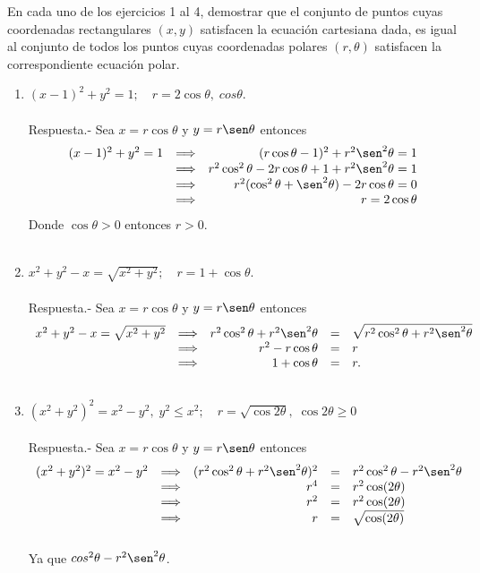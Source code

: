 En cada uno de los ejercicios 1 al 4, demostrar que el conjunto de puntos cuyas coordenadas rectangulares $(x,y)$ satisfacen la ecuación cartesiana dada, es igual al conjunto de todos los puntos cuyas coordenadas polares $(r,\theta)$ satisfacen la correspondiente ecuación polar.
\begin{enumerate}

    \item $(x-1)^2 + y^2 = 1;\quad r=2\cos \theta, \; cos \theta$.\\\\
	Respuesta.-\; Sea $x = r\cos \theta$ y $y=r\sen \theta$ entonces
	$$\begin{array}{rcr}
	    (x-1)^2 + y^2 = 1 &\Longrightarrow & (r\cos \theta - 1)^2 + r^2 \sen^2 \theta = 1\\
	    &\Longrightarrow & r^2 \cos^2 \theta - 2r \cos \theta  + 1 + r^2\sen^2 \theta = 1\\
	    &\Longrightarrow & r^2(\cos^2 \theta + \sen^2 \theta) - 2r\cos \theta = 0\\
	    &\Longrightarrow & r = 2\cos \theta\\
	\end{array}$$
	Donde $\cos \theta > 0$ entonces $r>0$.\\\\

    \item $x^2 + y^2 - x = \sqrt{x^2 + y^2};\quad r=1+\cos \theta$.\\\\
	Respuesta.-\; Sea  $x = r\cos \theta$ y $y=r\sen \theta$ entonces
	$$\begin{array}{rcrcl}
	    x^2 + y^2 - x = \sqrt{x^2 + y^2}&\Longrightarrow&r^2\cos^2 \theta + r^2\sen^2 \theta&=&\sqrt{r^2\cos^2\theta + r^2\sen^2\theta}\\
	    &\Longrightarrow&r^2 - r\cos \theta&=&r\\
	    &\Longrightarrow&1+\cos \theta&=&r.\\\\
	\end{array}$$


    \item $(x^2+y^2)^2 = x^2 - y^2,\; y^2 \leq x^2; \quad r=\sqrt{\cos 2\theta},\; \cos 2\theta \geq 0$\\\\
	Respuesta.-\; Sea $x = r\cos \theta$ y $y=r\sen \theta$ entonces
	$$\begin{array}{rcrcl}
	    (x^2+y^2)^2 = x^2 - y^2 &\Longrightarrow& (r^2 \cos^2 \theta + r^2 \sen^2 \theta)^2&=&r^2 \cos^2 \theta - r^2 \sen^2 \theta\\
				    &\Longrightarrow&r^4&=&r^2\cos(2\theta)\\
				    &\Longrightarrow&r^2&=&r^2 \cos(2\theta)\\
				    &\Longrightarrow&r&=&\sqrt{\cos(2\theta)}\\\\
	\end{array}$$
	Ya que $cos^2\theta - r^2 \sen^2 \theta$.\\\\



\end{enumerate}

